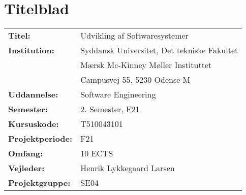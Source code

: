 \section{Titelblad}
\begin{table}[h!]
    \centering
    \begin{tabular}{ll}
        \textbf{Titel:} & Udvikling af Softwaresystemer \\
        \textbf{Institution:} & Syddansk Universitet, Det tekniske Fakultet\\
        & Mærsk Mc-Kinney Møller Instituttet\\
        & Campusvej 55, 5230 Odense M\\
        \textbf{Uddannelse:} & Software Engineering\\
        \textbf{Semester:} & 2. Semester, F21\\
        \textbf{Kursuskode:} & T510043101\\
        \textbf{Projektperiode:} & F21\\
        \textbf{Omfang:} & 10 ECTS\\
        \textbf{Vejleder:} & Henrik Lykkegaard Larsen\\
        \textbf{Projektgruppe:} & SE04\\
    \end{tabular}
\end{table}

